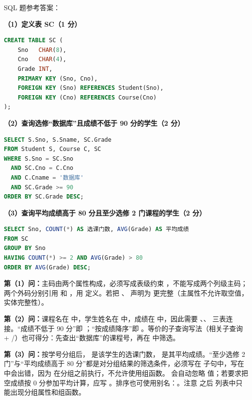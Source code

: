 \documentclass[a4paper,11pt]{article}
\begin{document}

\q SQL 题参考答案：

\textbf{（1）定义表 SC（1 分）}
\begin{lstlisting}[language=SQL]
CREATE TABLE SC (
    Sno   CHAR(8),
    Cno   CHAR(4),
    Grade INT,
    PRIMARY KEY (Sno, Cno),
    FOREIGN KEY (Sno) REFERENCES Student(Sno),
    FOREIGN KEY (Cno) REFERENCES Course(Cno)
);
\end{lstlisting}

\textbf{（2）查询选修“数据库”且成绩不低于 90 分的学生（2 分）}
\begin{lstlisting}[language=SQL]
SELECT S.Sno, S.Sname, SC.Grade
FROM Student S, Course C, SC
WHERE S.Sno = SC.Sno
  AND SC.Cno = C.Cno
  AND C.Cname = '数据库'
  AND SC.Grade >= 90
ORDER BY SC.Grade DESC;
\end{lstlisting}

\textbf{（3）查询平均成绩高于 80 分且至少选修 2 门课程的学生（2 分）}
\begin{lstlisting}[language=SQL]
SELECT Sno, COUNT(*) AS 选课门数, AVG(Grade) AS 平均成绩
FROM SC
GROUP BY Sno
HAVING COUNT(*) >= 2 AND AVG(Grade) > 80
ORDER BY AVG(Grade) DESC;
\end{lstlisting}

\begin{analysis}
\textbf{第（1）问：}主码由两个属性构成，必须写成表级约束 ，不能写成两个列级主码；两个外码分别引用  和 ，用  定义。若把 、 声明为  更完整（主属性不允许取空值，实体完整性）。

\textbf{第（2）问：}课程名在  中，学生姓名在  中，成绩在  中，因此需要 、、 三表连接。“成绩不低于 90 分”即 ；“按成绩降序”即 。等价的子查询写法（相关子查询 + /）也可得分：先查出“数据库”的课程号，再在  中筛选。

\textbf{第（3）问：}按学号分组后， 是该学生的选课门数， 是其平均成绩。“至少选修 2 门”与“平均成绩高于 80 分”都是对分组结果的筛选条件，必须写在  子句中，写在  中会出错，因为  在分组之前执行，不允许使用组函数。 会自动忽略  值；若要求把空成绩按 0 分参加平均计算，应写 。排序也可使用别名：。注意  之后  列表中只能出现分组属性和组函数。
\end{analysis}
\end{document}
